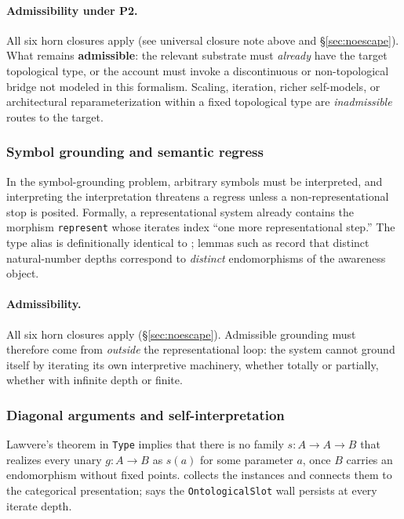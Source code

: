 \documentclass[11pt]{article}
\begin{document}
\paragraph{Admissibility under P2.}
All six horn closures apply (see universal closure note above and
\S\ref{sec:noescape}).  What remains \textbf{admissible}: the relevant
substrate must \emph{already} have the target topological type, or the
account must invoke a discontinuous or non-topological bridge not modeled
in this formalism.  Scaling, iteration, richer self-models, or
architectural reparameterization within a fixed topological type are
\emph{inadmissible} routes to the target.

\subsubsection{Symbol grounding and semantic regress}

In the symbol-grounding problem, arbitrary symbols must be interpreted, and
interpreting the interpretation threatens a regress unless a non-representational
stop is posited. Formally, a representational system already contains the morphism
\texttt{represent} whose iterates index ``one more representational step.'' The
type alias  is definitionally identical to
; lemmas such as
 record that distinct
natural-number depths correspond to \emph{distinct} endomorphisms of the
awareness object.

\paragraph{Admissibility.}
All six horn closures apply (\S\ref{sec:noescape}).  Admissible
grounding must therefore come from \emph{outside} the representational
loop: the system cannot ground itself by iterating its own interpretive
machinery, whether totally or partially, whether with infinite depth or
finite.

\subsubsection{Diagonal arguments and self-interpretation}

Lawvere's theorem in \texttt{Type} implies that there is no family
$s : A \to A \to B$ that realizes every unary $g : A \to B$ as $s(a)$ for some
parameter $a$, once $B$ carries an endomorphism without fixed points.
 collects the instances and connects them to
the categorical presentation;
 says the
\texttt{OntologicalSlot} wall persists at every iterate depth.
\end{document}
